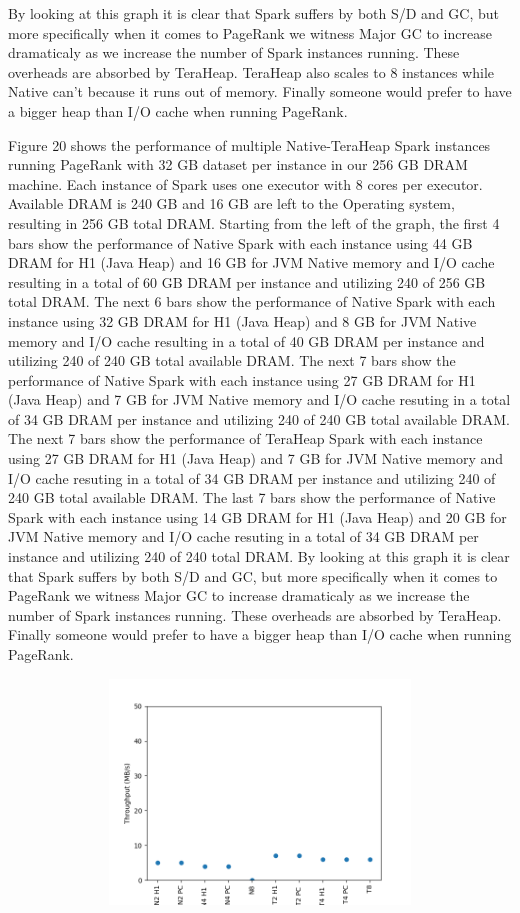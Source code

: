 \documentclass[twocolumn,10pt]{asme2e}
\begin{document}
By looking at this graph it is clear that Spark suffers by both S/D and GC, but more specifically when it comes to PageRank we witness Major GC to increase dramaticaly as we increase the number of Spark instances running. These overheads are absorbed by TeraHeap. TeraHeap also scales to 8 instances while Native can't because it runs out of memory. Finally someone would prefer to have a bigger heap than I/O cache when running PageRank.

Figure 20 shows the performance of multiple Native-TeraHeap Spark instances running PageRank with 32 GB dataset per instance in our 256 GB DRAM machine. Each instance of Spark uses one executor with 8 cores per executor. Available DRAM is 240 GB and 16 GB are left to the Operating system, resulting in 256 GB total DRAM. Starting from the left of the graph, the first 4 bars show the performance of Native Spark with each instance using 44 GB DRAM for H1 (Java Heap) and 16 GB for JVM Native memory and I/O cache resulting in a total of 60 GB DRAM per instance and utilizing 240 of 256 GB total DRAM. The next 6 bars show the performance of Native Spark with each instance using 32 GB DRAM for H1 (Java Heap) and 8 GB for JVM Native memory and I/O cache resulting in a total of 40 GB DRAM per instance and utilizing 240 of 240 GB total available DRAM. The next 7 bars show the performance of Native Spark with each instance using 27 GB DRAM for H1 (Java Heap) and 7 GB for JVM Native memory and I/O cache resuting in a total of 34 GB DRAM per instance and utilizing 240 of 240 GB total available DRAM. The next 7 bars show the performance of TeraHeap Spark with each instance using 27 GB DRAM for H1 (Java Heap) and 7 GB for JVM Native memory and I/O cache resuting in a total of 34 GB DRAM per instance and utilizing 240 of 240 GB total available DRAM. The last 7 bars show the performance of Native Spark with each instance using 14 GB DRAM for H1 (Java Heap) and 20 GB for JVM Native memory and I/O cache resuting in a total of 34 GB DRAM per instance and utilizing 240 of 240 total DRAM. By looking at this graph it is clear that Spark suffers by both S/D and GC, but more specifically when it comes to PageRank we witness Major GC to increase dramaticaly as we increase the number of Spark instances running. These overheads are absorbed by TeraHeap.
Finally someone would prefer to have a bigger heap than I/O cache when running PageRank.

\begin{figure}[h!]
        \includegraphics[width=13cm,height=6cm]{PR_64_THR.png}
\end{figure}
\end{document}
